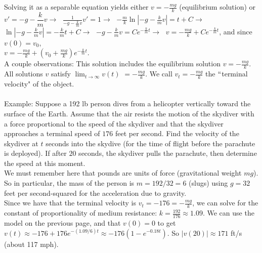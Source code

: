 \documentclass{ximera}
\begin{document}

\newpage

 Solving it as a separable equation yields either $v=-\frac{mg}{k}$ (equilibrium solution) or  \\

 $v'=-g-\dfrac{k}{m}v\rightarrow \;$ $\displaystyle \frac{1}{-g-\frac{k}{m}v}v'=1\rightarrow \;$ $\displaystyle -\frac{m}{k}\ln{\left|-g-\frac{k}{m}v\right|}=t+C\rightarrow $ \\

 $\displaystyle \ln{\left|-g-\frac{k}{m}v\right|}=-\frac{k}{m}t+C\rightarrow \;$  $\displaystyle -g-\frac{k}{m}v=Ce^{-\frac{k}{m}t}\rightarrow \;$  $\displaystyle v=-\frac{mg}{k}+Ce^{-\frac{k}{m}t}$, and since $v(0)=v_0$, \\

 $\displaystyle v=-\frac{mg}{k}+\left(v_0+\frac{mg}{k}\right)e^{-\frac{k}{m}t}$.\\

 A couple observations:  This solution includes the equilibrium solution $v=-\frac{mg}{k}$.  All solutions $v$ satisfy $\displaystyle \lim_{t\rightarrow \infty}v(t)$ $=-\frac{mg}{k}$.  We call $v_t=-\frac{mg}{k}$ the $``$terminal velocity" of the object. \\ \\



Example:   Suppose a 192 lb person dives from a helicopter vertically toward the surface of the Earth.   Assume that the air resists the motion of the skydiver with a force proportional to the speed of the skydiver  and that the skydiver approaches a terminal speed of $176$ feet per second.   Find the velocity of the skydiver at $t$ seconds into the skydive (for the time of flight before the parachute is deployed).  If after $20$ seconds, the skydiver pulls the parachute, then determine the speed at this moment.\\

 We must remember here that pounds are units of force (gravitational weight $mg$).  So in particular, the mass of the person is $m=192/32=6$ (slugs) using $g=32$ feet per second-squared for the acceleration due to gravity.\\

 Since we have that the terminal velocity is $v_t=-176=-\frac{mg}{k}$, we can solve for the constant of proportionality of medium resistance:  $k=\frac{192}{176}\approx 1.09$.  We can use the model on the previous page, and that $v(0)=0$ to get $\displaystyle v(t)\approx -176+176e^{-(1.09/6)t}\approx -176\left(1-e^{-0.18 t}\right)$.  So $|v(20)|\approx 171$ ft/s (about 117 mph).
\end{document}
